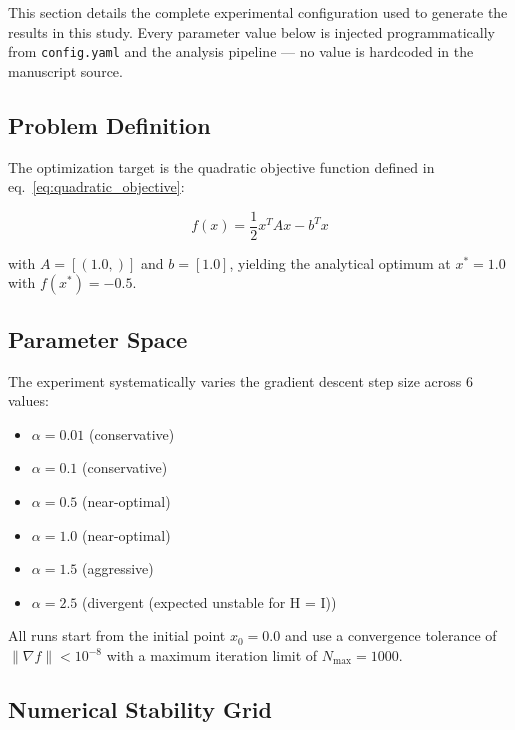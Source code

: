 \documentclass[
  english,
]{article}
\providecommand{\tightlist}{%
  \setlength{\itemsep}{0pt}\setlength{\parskip}{0pt}}
\begin{document}
This section details the complete experimental configuration used to
generate the results in this study. Every parameter value below is
injected programmatically from \texttt{config.yaml} and the analysis
pipeline --- no value is hardcoded in the manuscript source.

\subsection{Problem Definition}\label{problem-definition}

The optimization target is the quadratic objective function defined in
eq.~\ref{eq:quadratic_objective}:

\begin{equation}
\label{eq:quadratic_objective}
f(x) = \frac{1}{2} x^T A x - b^T x
\end{equation}

with \(A = [(1.0,)]\) and \(b = [1.0]\), yielding the analytical optimum
at \(x^* = 1.0\) with \(f(x^*) = -0.5\).

\subsection{Parameter Space}\label{parameter-space}

The experiment systematically varies the gradient descent step size
across 6 values:

\begin{itemize}
\tightlist
\item
  \(\alpha = 0.01\) (conservative)
\item
  \(\alpha = 0.1\) (conservative)
\item
  \(\alpha = 0.5\) (near-optimal)
\item
  \(\alpha = 1.0\) (near-optimal)
\item
  \(\alpha = 1.5\) (aggressive)
\item
  \(\alpha = 2.5\) (divergent (expected unstable for H = I))
\end{itemize}

All runs start from the initial point \(x_0 = 0.0\) and use a
convergence tolerance of \(\|{\nabla f}\| < 10^{-8}\) with a maximum
iteration limit of \(N_{\max} = 1000\).

\subsection{Numerical Stability Grid}\label{numerical-stability-grid}
\end{document}
